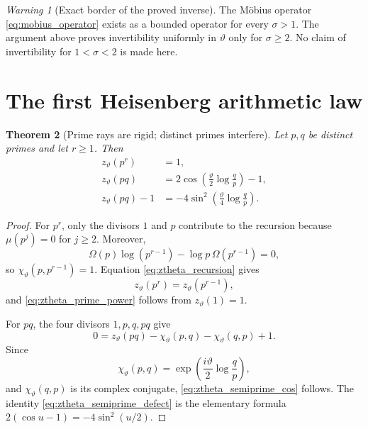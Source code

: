 \documentclass[11pt]{amsart}
\numberwithin{equation}{section}
\theoremstyle{plain}
\newtheorem{theorem}{Theorem}[section]
\theoremstyle{definition}
\theoremstyle{remark}
\newtheorem{warning}[theorem]{Warning}
\newcommand{\Om}{\Omega}
\begin{document}
\begin{warning}[Exact border of the proved inverse]
\label{warn:inverse_border}
The M\"obius operator \eqref{eq:mobius_operator} exists as a bounded operator
for every $\sigma>1$.  The argument above proves invertibility uniformly in
$\vartheta$ only for $\sigma\ge2$.  No claim of invertibility for
$1<\sigma<2$ is made here.
\end{warning}

\section{The first Heisenberg arithmetic law}
\label{sec:prime_pair_interference}

\begin{theorem}[Prime rays are rigid; distinct primes interfere]
\label{thm:prime_pair_interference}
Let $p,q$ be distinct primes and let $r\ge1$.  Then
\begin{align}
z_{\vartheta}(p^r)
&=1,
\label{eq:ztheta_prime_power}\\
z_{\vartheta}(pq)
&=
2\cos\!\left(\frac{\vartheta}{2}\log\frac{q}{p}\right)-1,
\label{eq:ztheta_semiprime_cos}\\
z_{\vartheta}(pq)-1
&=
-4\sin^2\!\left(\frac{\vartheta}{4}\log\frac{q}{p}\right).
\label{eq:ztheta_semiprime_defect}
\end{align}
\end{theorem}

\begin{proof}
For $p^r$, only the divisors $1$ and $p$ contribute to the recursion because
$\mu(p^j)=0$ for $j\ge2$.  Moreover,
\begin{equation}
\Om(p)\log(p^{r-1})
-
\log p\,\Om(p^{r-1})
=0,
\label{eq:prime_power_symplectic_zero}
\end{equation}
so $\chi_{\vartheta}(p,p^{r-1})=1$.  Equation
\eqref{eq:ztheta_recursion} gives
\begin{equation}
z_{\vartheta}(p^r)=z_{\vartheta}(p^{r-1}),
\label{eq:prime_power_recursion}
\end{equation}
and \eqref{eq:ztheta_prime_power} follows from $z_{\vartheta}(1)=1$.

For $pq$, the four divisors $1,p,q,pq$ give
\begin{equation}
0
=
z_{\vartheta}(pq)
-
\chi_{\vartheta}(p,q)
-
\chi_{\vartheta}(q,p)
+1.
\label{eq:pq_inverse_equation}
\end{equation}
Since
\begin{equation}
\chi_{\vartheta}(p,q)
=
\exp\!\left(\frac{i\vartheta}{2}\log\frac{q}{p}\right),
\label{eq:chi_pq}
\end{equation}
and $\chi_{\vartheta}(q,p)$ is its complex conjugate,
\eqref{eq:ztheta_semiprime_cos} follows.  The identity
\eqref{eq:ztheta_semiprime_defect} is the elementary formula
$2(\cos u-1)=-4\sin^2(u/2)$.
\end{proof}
\end{document}
